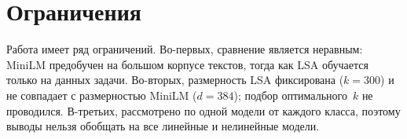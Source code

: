 \section{Ограничения}

Работа имеет ряд ограничений. Во-первых, сравнение является неравным:
MiniLM предобучен на большом корпусе текстов, тогда как LSA обучается
только на данных задачи. Во-вторых, размерность LSA фиксирована
($k = 300$) и не совпадает с размерностью MiniLM ($d = 384$); подбор
оптимального~$k$ не проводился. В-третьих, рассмотрено по одной модели
от каждого класса, поэтому выводы нельзя обобщать на все линейные и
нелинейные модели.
